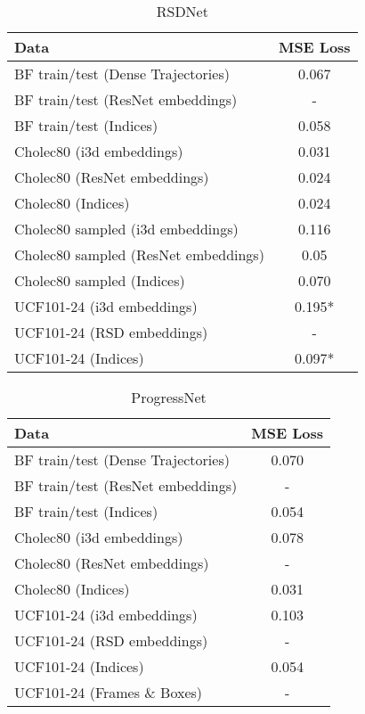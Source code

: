\documentclass[10pt,twocolumn,letterpaper]{article}
\begin{document}
 \begin{table}
   \centering
   \begin{tabular}{@{}lc@{}}
     \toprule
     Data & MSE Loss \\
     \midrule
     BF train/test (Dense Trajectories) & 0.067 \\
     BF train/test (ResNet embeddings) & - \\
     BF train/test (Indices) & 0.058 \\

     \midrule
     Cholec80 (i3d embeddings) & 0.031 \\
     Cholec80 (ResNet embeddings) & 0.024 \\
     Cholec80 (Indices) & 0.024 \\

     Cholec80 sampled (i3d embeddings) & 0.116 \\
     Cholec80 sampled (ResNet embeddings) & 0.05 \\
     Cholec80 sampled (Indices) & 0.070 \\
     
     \midrule
     UCF101-24 (i3d embeddings) & 0.195* \\
     UCF101-24 (RSD embeddings) & -\\
     UCF101-24 (Indices) & 0.097* \\

     \bottomrule
   \end{tabular}
   \caption{RSDNet}
   \label{tab:rsdnet}
 \end{table}

 \begin{table}
  \centering
  \begin{tabular}{@{}lc@{}}
    \toprule
    Data & MSE Loss \\
    \midrule
    BF train/test (Dense Trajectories) & 0.070 \\
    BF train/test (ResNet embeddings) & - \\
    BF train/test (Indices) & 0.054 \\

    \midrule
    Cholec80 (i3d embeddings) & 0.078 \\
    Cholec80 (ResNet embeddings) & - \\
    Cholec80 (Indices) & 0.031 \\

    \midrule
    UCF101-24 (i3d embeddings) & 0.103 \\
    UCF101-24 (RSD embeddings) & -\\
    UCF101-24 (Indices) & 0.054 \\

    \midrule
    UCF101-24 (Frames \& Boxes) & - \\

    \bottomrule
  \end{tabular}
  \caption{ProgressNet}
  \label{tab:progressnet}
\end{table}
\end{document}
